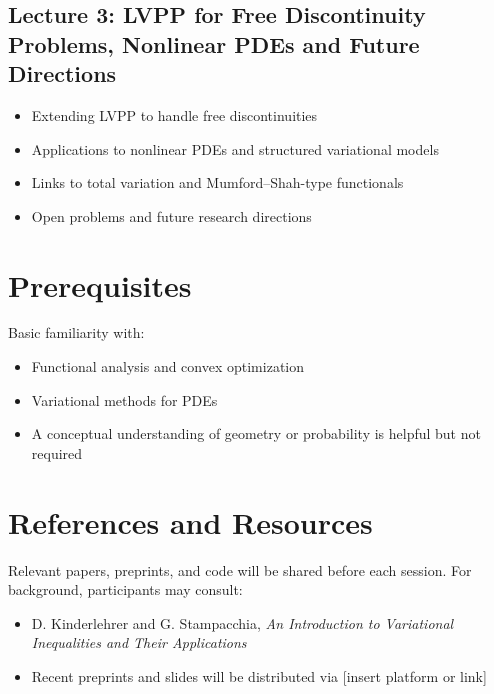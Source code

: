 \documentclass[11pt]{article}
\begin{document}
\subsection*{Lecture 3: LVPP for Free Discontinuity Problems, Nonlinear PDEs and Future Directions}
\begin{itemize}[leftmargin=1.5em]
  \item Extending LVPP to handle free discontinuities
  \item Applications to nonlinear PDEs and structured variational models
  \item Links to total variation and Mumford–Shah-type functionals
  \item Open problems and future research directions
\end{itemize}

\section*{Prerequisites}
Basic familiarity with:
\begin{itemize}[leftmargin=1.5em]
  \item Functional analysis and convex optimization
  \item Variational methods for PDEs
  \item A conceptual understanding of geometry or probability is helpful but not required
\end{itemize}

\section*{References and Resources}
Relevant papers, preprints, and code will be shared before each session. For background, participants may consult:
\begin{itemize}[leftmargin=1.5em]
  \item D. Kinderlehrer and G. Stampacchia, \textit{An Introduction to Variational Inequalities and Their Applications}
  \item Recent preprints and slides will be distributed via [insert platform or link]
\end{itemize}
\end{document}
